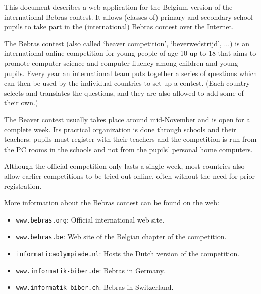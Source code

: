 
This document describes a web application for the Belgium version of the
international Bebras contest. It allows (classes of) primary and secondary
school pupils to take part in the (international) Bebras contest over the
Internet.

The Bebras contest (also called `beaver competition', `beverwedstrijd', ...) is
an international online competition for young people of age 10 up to 18 that
aims to promote computer science and computer fluency among children and young
pupils. Every year an international team puts together a series of questions
which can then be used by the individual countries to set up a contest. (Each
country selects and translates the questions, and they are also allowed to add
some of their own.)

The Beaver contest usually takes place around mid-November and is open for a
complete week. Its practical organization is done through schools and their
teachers: pupils must register with their teachers and the competition is run
from the PC rooms in the schools and not from the pupils' personal home
computers.

Although the official competition only lasts a single week, most countries also
allow earlier competitions to be tried out online, often without the need for
prior registration.

More information about the Bebras contest can be found on the web:
\begin{itemize}
    \item \texttt{www.bebras.org}: Official international web site.
    \item \texttt{www.bebras.be}: Web site of the Belgian chapter of the competition.
    \item \texttt{informaticaolympiade.nl}: Hosts the Dutch version of the competition.
    \item \texttt{www.informatik-biber.de}: Bebras in Germany.
    \item \texttt{www.informatik-biber.ch}: Bebras in Switzerland.
\end{itemize}


